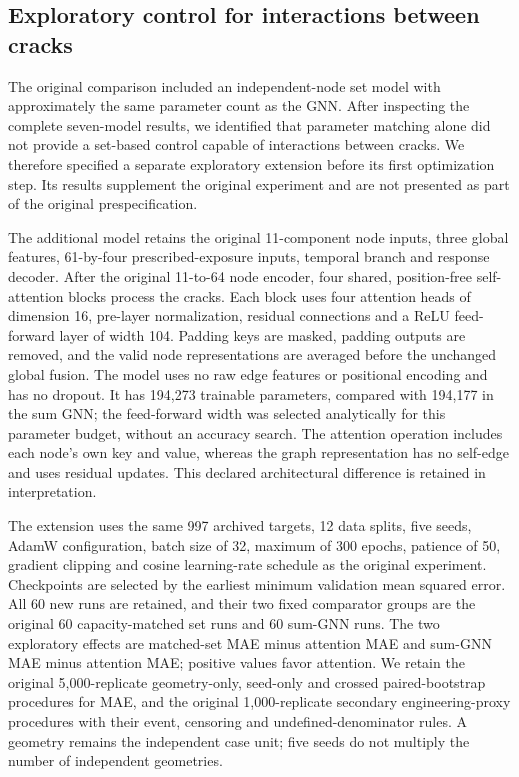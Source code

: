 \subsection{Exploratory control for interactions between cracks}
The original comparison included an independent-node set model with approximately the same parameter count as the GNN. After inspecting the complete seven-model results, we identified that parameter matching alone did not provide a set-based control capable of interactions between cracks. We therefore specified a separate exploratory extension before its first optimization step. Its results supplement the original experiment and are not presented as part of the original prespecification.

The additional model retains the original 11-component node inputs, three global features, 61-by-four prescribed-exposure inputs, temporal branch and response decoder. After the original 11-to-64 node encoder, four shared, position-free self-attention blocks process the cracks. Each block uses four attention heads of dimension 16, pre-layer normalization, residual connections and a ReLU feed-forward layer of width 104. Padding keys are masked, padding outputs are removed, and the valid node representations are averaged before the unchanged global fusion. The model uses no raw edge features or positional encoding and has no dropout. It has 194,273 trainable parameters, compared with 194,177 in the sum GNN; the feed-forward width was selected analytically for this parameter budget, without an accuracy search. The attention operation includes each node's own key and value, whereas the graph representation has no self-edge and uses residual updates. This declared architectural difference is retained in interpretation.

The extension uses the same 997 archived targets, 12 data splits, five seeds, AdamW configuration, batch size of 32, maximum of 300 epochs, patience of 50, gradient clipping and cosine learning-rate schedule as the original experiment. Checkpoints are selected by the earliest minimum validation mean squared error. All 60 new runs are retained, and their two fixed comparator groups are the original 60 capacity-matched set runs and 60 sum-GNN runs. The two exploratory effects are matched-set MAE minus attention MAE and sum-GNN MAE minus attention MAE; positive values favor attention. We retain the original 5,000-replicate geometry-only, seed-only and crossed paired-bootstrap procedures for MAE, and the original 1,000-replicate secondary engineering-proxy procedures with their event, censoring and undefined-denominator rules. A geometry remains the independent case unit; five seeds do not multiply the number of independent geometries.

